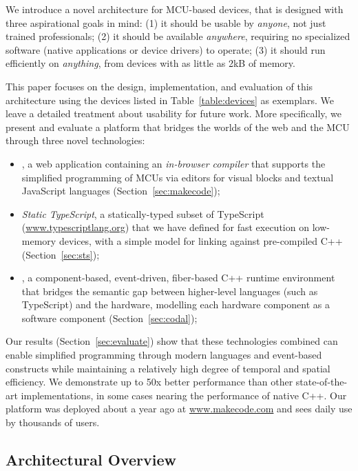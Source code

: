 We introduce a novel architecture for MCU-based devices,
that is designed with three aspirational goals in mind:
(1) it should be usable by \emph{anyone}, not just trained professionals;
(2) it should be available \emph{anywhere}, requiring no specialized software (native applications
or device drivers) to operate;
(3) it should run efficiently on \emph{anything}, from devices with as little as 2kB of memory.

This paper focuses on the design, implementation, and evaluation of this architecture using the devices listed in Table~\ref{table:devices} as exemplars. We leave a detailed treatment about usability for future work.
More specifically, we present and evaluate a platform that bridges the worlds of the web and the
MCU through three novel technologies:

\begin{itemize}
\item \emph{\MCN}, a web application containing an \emph{in-browser compiler} that supports the
simplified programming of MCUs via editors for visual blocks and textual JavaScript languages
(Section~\ref{sec:makecode});

\item \emph{Static TypeScript}, a statically-typed subset of TypeScript
(\url{www.typescriptlang.org}) that we have defined for fast execution on low-memory devices,
with a simple model for linking against pre-compiled C++ (Section~\ref{sec:sts});

\item \emph{\CO}, a component-based, event-driven, fiber-based C++ runtime environment
that bridges the semantic gap between higher-level languages (such as TypeScript) and the hardware,
modelling each hardware component as a software component (Section~\ref{sec:codal});
\end{itemize}
Our results (Section~\ref{sec:evaluate}) show that these technologies combined can enable simplified programming through modern
languages and event-based constructs while maintaining a relatively high degree of temporal and spatial efficiency.
We demonstrate up to 50x better performance than other state-of-the-art implementations,
in some cases nearing the performance of native C++.  Our platform was deployed about a year ago 
at \url{www.makecode.com} and sees daily use by thousands of users.

\subsection{Architectural Overview}


